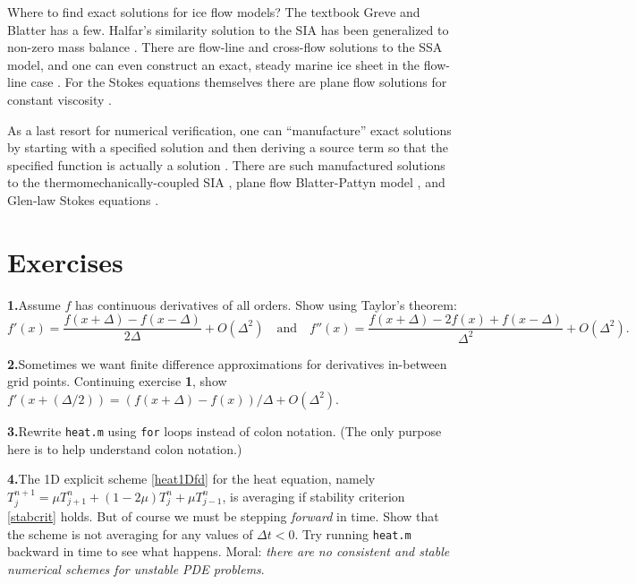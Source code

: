 \documentclass[letterpaper,final,12pt,reqno]{amsart}
\begin{document}
Where to find exact solutions for ice flow models?  The textbook Greve and Blatter \cite{GreveBlatter2009} has a few.  Halfar's similarity solution to the SIA \cite{Halfar81,Halfar83} has been generalized to non-zero mass balance \cite{BLKCB}.  There are flow-line \cite{Bodvardsson,vanderVeen83} and cross-flow \cite{SchoofStream} solutions to the SSA model, and one can even construct an exact, steady marine ice sheet in the flow-line case \cite{Bueler2014exactmarine}.  For the Stokes equations themselves there are plane flow solutions for constant viscosity \cite{BaliseRaymond1985}.

As a last resort for numerical verification, one can ``manufacture'' exact solutions by starting with a specified solution and then deriving a source term so that the specified function is actually a solution \cite{Roache}.  There are such manufactured solutions to the thermomechanically-coupled SIA \cite{BBL}, plane flow Blatter-Pattyn model \cite{GlowinskiRappaz}, and Glen-law Stokes equations \cite{JouvetRappaz2011,Lengetal2012,SargentFastook2010}.

\footnotesize

\bigskip
\bigskip
%
%


\bigskip
\bigskip
\small
\section*{Exercises}

\newcommand{\exer}[2]{\medskip\noindent \textbf{#1.}\quad #2}

\exer{1}{Assume $f$ has continuous derivatives of all orders.  Show using Taylor's theorem:
  $$f'(x) = \frac{f(x+\Delta) - f(x-\Delta)}{2\Delta} + O(\Delta^2) \quad \text{and} \quad f''(x) = \frac{f(x+\Delta) - 2 f(x) + f(x-\Delta)}{\Delta^2} + O(\Delta^2).$$}

\exer{2}{Sometimes we want finite difference approximations for derivatives in-between grid points.  Continuing exercise \textbf{1}, show $f'(x+(\Delta/2)) = (f(x+\Delta) - f(x))/\Delta + O(\Delta^2)$.}

\exer{3}{Rewrite \texttt{heat.m} using \texttt{for} loops instead of colon notation.  (The only purpose here is to help understand colon notation.)}

\exer{4}{The 1D explicit scheme \eqref{heat1Dfd} for the heat equation, namely $T_j^{n+1} = \mu T_{j+1}^n + (1 - 2 \mu) T_j^n + \mu T_{j-1}^n$, is averaging if stability criterion \eqref{stabcrit} holds.  But of course we must be stepping \emph{forward} in time.  Show that the scheme is not averaging for any values of $\Delta t < 0$.  Try running \texttt{heat.m} backward in time to see what happens.  Moral: \emph{there are no consistent and stable numerical schemes for unstable PDE problems}.}
\end{document}
